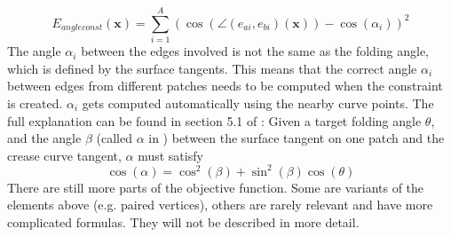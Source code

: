 \documentclass[a4paper,twoside,12pt,nochapterprefix]{scrbook}
\begin{document}
\begin{equation}
E_{angleconst}(\mathbf{x}) = \sum_{i = 1}^A (\cos( \angle(e_{ai}, e_{bi})(\mathbf{x})) - \cos(\alpha_i ))^2
\end{equation}
The angle $\alpha_i$ between the edges involved is not the same as the folding angle, which is defined by the surface tangents. This means that the correct angle $\alpha_i$ between edges from different patches needs to be computed when the constraint is created. $\alpha_i$ gets computed automatically using the nearby curve points. The full explanation can be found in section 5.1 of \cite{Rabinovich:CurvedFolds:2019}: Given a target folding angle $\theta$, and the angle $\beta$ (called $\alpha$ in \cite{Rabinovich:CurvedFolds:2019}) between the surface tangent on one patch and the crease curve tangent, $\alpha$ must satisfy
\begin{equation}
\cos(\alpha)= \cos^2(\beta) + \sin^2(\beta)\cos(\theta)
\end{equation}
There are still more parts of the objective function. Some are variants of the elements above (e.g. paired vertices), others are rarely relevant and have more complicated formulas. They will not be described in more detail.\newline
\end{document}

